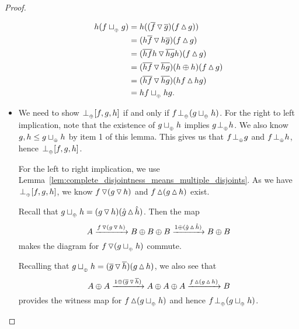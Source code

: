 \begin{proof}
\begin{itemize}
      \begin{align*}
        h (f\tjoin g) &= h ((\rst{f}\tjdown\rst{g})  (f \tjup g))\\
        &= (h\rst{f}\tjdown h\rst{g}) (f \tjup g)\\
        &= (\rst{h f}h\tjdown \rst{h g}h)  (f \tjup g)\\
        &= (\rst{h f}\tjdown \rst{h g})(h\+h)  (f \tjup g)\\
        &= (\rst{h f}\tjdown \rst{h g}) (h f \tjup h g)\\
        &= h f \tjoin h g.
      \end{align*}


    \item [\axiom{DJ}{4}] We need to show $\tperp [f,g,h]$ if and only if $f \tperp (g \tjoin h)$.
      For the right to left implication, note that the existence of $g\tjoin h$ implies $g \tperp
      h$. We also know $g, h \le g\tjoin h$ by item 1 of this lemma. This gives us that $f \tperp
      g$ and $f \tperp h$, hence $\tperp [f,g,h]$.

      For the left to right implication, we use
      Lemma~\ref{lem:complete_disjointness_means_multiple_disjoints}. As we have $\tperp [f,g,h]$,
      we  know $f\tjdown(g\tjdown h)$ and $f\tjup(g\tjup h)$ exist.

      Recall that $g\tjoin h = (g\tjdown h)(\rg{g}\tjup\rg{h})$. Then the map
      \[
        A\xrightarrow{f\tjdown(g\tjdown h)} B\+B\+B\xrightarrow{1\+(\rg{g}\tjup\rg{h})} B\+B
      \]
      makes the diagram for $f \tjdown (g\tjoin h)$ commute.

      Recalling that  $g\tjoin h =
      (\rst{g}\tjdown \rst{h})(g\tjup h)$, we also see that
      \[
        A\+A\xrightarrow{1\+(\rst{g}\tjdown\rst{h})}A\+A\+A\xrightarrow{f\tjup(g\tjup h)}B
      \]
      provides the witness map for $f \tjup(g\tjoin h)$ and hence $f \tperp (g \tjoin h)$.
  \end{itemize}

\end{proof}



